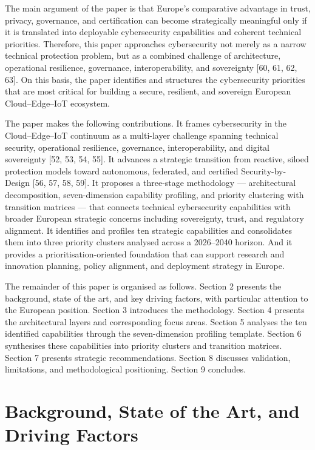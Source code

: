 \documentclass{ieeeaccess}
\begin{document}
The main argument of the paper is that Europe's comparative advantage in
trust, privacy, governance, and certification can become strategically
meaningful only if it is translated into deployable cybersecurity
capabilities and coherent technical priorities. Therefore, this paper
approaches cybersecurity not merely as a narrow technical protection
problem, but as a combined challenge of architecture, operational
resilience, governance, interoperability, and sovereignty {[}60, 61, 62,
63{]}. On this basis, the paper identifies and structures the
cybersecurity priorities that are most critical for building a secure,
resilient, and sovereign European Cloud--Edge--IoT ecosystem.

The paper makes the following contributions. It frames
cybersecurity in the Cloud--Edge--IoT continuum as a multi-layer
challenge spanning technical security, operational resilience,
governance, interoperability, and digital sovereignty {[}52, 53, 54,
55{]}. It advances a strategic transition from reactive, siloed
protection models toward autonomous, federated, and certified
Security-by-Design {[}56, 57, 58, 59{]}. It proposes a three-stage
methodology --- architectural decomposition, seven-dimension
capability profiling, and priority clustering with transition matrices
--- that connects technical cybersecurity capabilities with broader
European strategic concerns including sovereignty, trust, and regulatory
alignment. It identifies and profiles ten strategic capabilities and
consolidates them into three priority clusters analysed across a
2026--2040 horizon. And it provides a prioritisation-oriented foundation
that can support research and innovation planning, policy alignment, and
deployment strategy in Europe.

The remainder of this paper is organised as follows. Section 2 presents
the background, state of the art, and key driving factors, with
particular attention to the European position. Section 3 introduces the
methodology. Section 4 presents the architectural layers and
corresponding focus areas. Section 5 analyses the ten identified
capabilities through the seven-dimension profiling template. Section 6
synthesises these capabilities into priority clusters and transition
matrices. Section 7 presents strategic recommendations. Section 8
discusses validation, limitations, and methodological positioning.
Section 9 concludes.

\section{Background, State of the Art, and Driving
Factors}\label{background-state-of-the-art-and-driving-factors}
\end{document}
